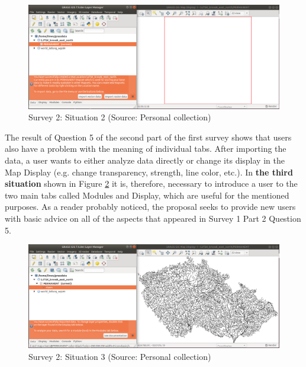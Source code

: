 \documentclass[a4paper,10pt,twoside]{article}
\begin{document}
\vspace{0.3cm}
\begin{figure}[hbt!] 
\begin{center}
\includegraphics[width=17cm]{../pictures/grass_infobar_2.png} 
\caption[Survey 2: Situation 2]{Survey 2: Situation 2 (Source: Personal collection)}
\label{fig:grass_infobar_2}
\end{center}
\end{figure}

\noindent The result of Question 5 of the second part of the first survey shows that users also have a problem with the meaning of individual tabs. After importing the data, a user wants to either analyze data directly or change its display in the Map Display (e.g. change transparency, strength, line color, etc.). In \textbf{the third situation} shown in Figure \ref{fig:grass_infobar_3} it is, therefore, necessary to introduce a user to the two main tabs called Modules and Display, which are useful for the mentioned purposes. As a reader probably noticed, the proposal seeks to provide new users with basic advice on all of the aspects that appeared in Survey 1 Part 2 Question 5.

\vspace{0.3cm}
\begin{figure}[hbt!] 
\begin{center}
\includegraphics[width=17cm]{../pictures/grass_infobar_3.png} 
\caption[Survey 2: Situation 3]{Survey 2: Situation 3 (Source: Personal collection)}
\label{fig:grass_infobar_3}
\end{center}
\end{figure}
\end{document}
